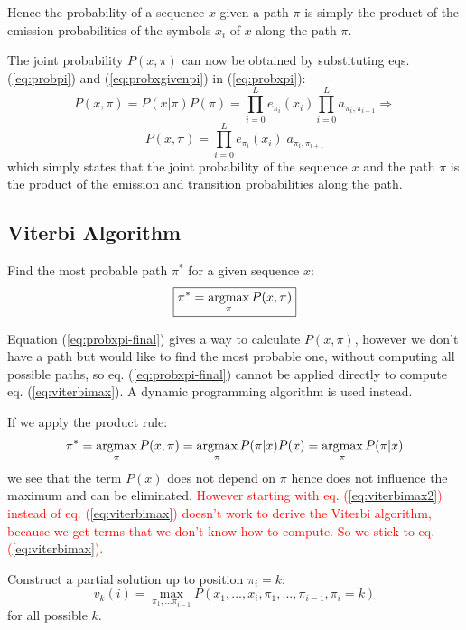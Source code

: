 Hence the probability of a sequence $x$ given a path $\pi$ is simply the product of the emission probabilities of the symbols $x_i$ of $x$ along the path $\pi$.

The joint probability $P(x,\pi)$ can now be obtained by substituting 
eqs. (\ref{eq:probpi}) and (\ref{eq:probxgivenpi}) in (\ref{eq:probxpi}):
\begin{equation}
P(x,\pi) = P(x | \pi) P(\pi) =
\prod_{i=0}^L e_{\pi_{i}}(x_i)
\prod_{i=0}^L a_{\pi_{i},\pi_{i+1}}
\Rightarrow
\end{equation}
\begin{equation}
\boxed{P(x,\pi) = \prod_{i=0}^L e_{\pi_{i}}(x_i) \; a_{\pi_{i},\pi_{i+1}}}
\label{eq:probxpi-final}
\end{equation}
which simply states that the joint probability of the sequence $x$ and the path $\pi$ is the product of the emission and transition probabilities along the path.

\subsection{Viterbi Algorithm}

Find the most probable path $\pi^*$ for a given sequence $x$:
\begin{equation}
\boxed{\pi^* = \argmax_{\pi} P(x,\pi)} \label{eq:viterbimax}
\end{equation}

Equation (\ref{eq:probxpi-final}) gives a way to calculate $P(x,\pi)$, however we don't have a path but would like to find the most probable one, without computing all possible paths, so eq. (\ref{eq:probxpi-final}) cannot be applied directly to compute eq. (\ref{eq:viterbimax}). A dynamic programming algorithm is used instead.

If we apply the product rule:
\begin{equation}
\pi^* = \argmax_{\pi} P(x,\pi) = \argmax_{\pi} P(\pi|x) P(x) 
= \argmax_{\pi} P(\pi|x)
\label{eq:viterbimax2}
\end{equation}
we see that the term $P(x)$ does not depend on $\pi$ hence does not influence the maximum and can be eliminated. \textcolor{red}{However starting with eq. (\ref{eq:viterbimax2}) instead of eq. (\ref{eq:viterbimax}) doesn't work to derive the Viterbi algorithm, because we get terms that we don't know how to compute. So we stick to eq. (\ref{eq:viterbimax}).}

Construct a partial solution up to position $\pi_i=k$:
\begin{equation}
v_k(i) = \max_{\pi_1,...\pi_{i-1}} P(x_1,...,x_i, \pi_1,...,\pi_{i-1}, \pi_i=k)
\end{equation}
for all possible $k$.

